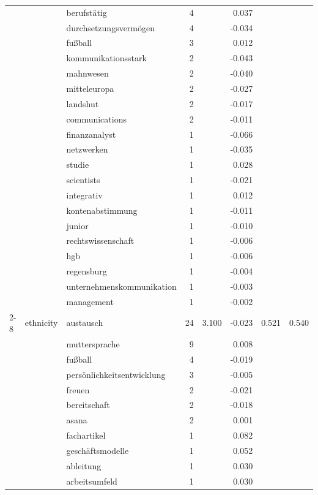 \begin{longtable}{lllrrr@{\hspace{1em}}r@{\hspace{1em}}r}
 &  & berufstätig & 4 &  & 0.037 &  &  \\
 &  & durchsetzungsvermögen & 4 &  & -0.034 &  &  \\
 &  & fußball & 3 &  & 0.012 &  &  \\
 &  & kommunikationsstark & 2 &  & -0.043 &  &  \\
 &  & mahnwesen & 2 &  & -0.040 &  &  \\
 &  & mitteleuropa & 2 &  & -0.027 &  &  \\
 &  & landshut & 2 &  & -0.017 &  &  \\
 &  & communications & 2 &  & -0.011 &  &  \\
 &  & finanzanalyst & 1 &  & -0.066 &  &  \\
 &  & netzwerken & 1 &  & -0.035 &  &  \\
 &  & studie & 1 &  & 0.028 &  &  \\
 &  & scientists & 1 &  & -0.021 &  &  \\
 &  & integrativ & 1 &  & 0.012 &  &  \\
 &  & kontenabstimmung & 1 &  & -0.011 &  &  \\
 &  & junior & 1 &  & -0.010 &  &  \\
 &  & rechtswissenschaft & 1 &  & -0.006 &  &  \\
 &  & hgb & 1 &  & -0.006 &  &  \\
 &  & regensburg & 1 &  & -0.004 &  &  \\
 &  & unternehmenskommunikation & 1 &  & -0.003 &  &  \\
 &  & management & 1 &  & -0.002 &  &  \\
\cmidrule(lr){2-8}
 & ethnicity & austausch & 24 & 3.100 & -0.023 & 0.521 & 0.540 \\
 &  & muttersprache & 9 &  & 0.008 &  &  \\
 &  & fußball & 4 &  & -0.019 &  &  \\
 &  & persönlichkeitsentwicklung & 3 &  & -0.005 &  &  \\
 &  & freuen & 2 &  & -0.021 &  &  \\
 &  & bereitschaft & 2 &  & -0.018 &  &  \\
 &  & asana & 2 &  & 0.001 &  &  \\
 &  & fachartikel & 1 &  & 0.082 &  &  \\
 &  & geschäftsmodelle & 1 &  & 0.052 &  &  \\
 &  & ableitung & 1 &  & 0.030 &  &  \\
 &  & arbeitsumfeld & 1 &  & 0.030 &  &  \\

\end{longtable}

